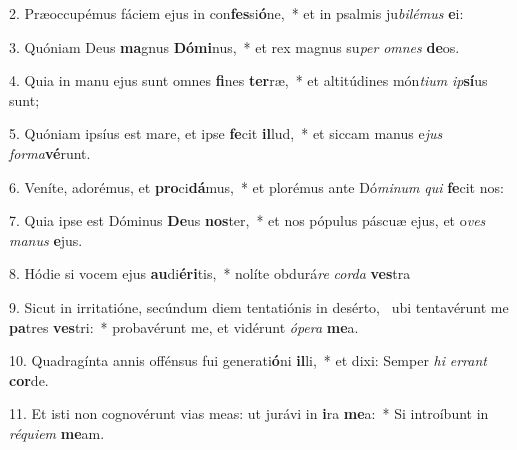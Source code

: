 2. Præoccupémus fáciem ejus in con\textbf{fes}si\textbf{ó}ne,~*  et in psalmis ju\textit{bi}\textit{lé}\textit{mus} \textbf{e}i:\

3. Quóniam Deus \textbf{ma}gnus \textbf{Dó}\textbf{mi}nus,~*  et rex magnus su\textit{per} \textit{om}\textit{nes} \textbf{de}os.\

4. Quia in manu ejus sunt omnes \textbf{fi}nes \textbf{ter}ræ,~*  et altitúdines món\textit{ti}\textit{um} \textit{ip}\textbf{sí}us sunt;\

5. Quóniam ipsíus est mare, et ipse \textbf{fe}cit \textbf{il}lud,~*  et siccam manus e\textit{jus} \textit{for}\textit{ma}\textbf{vé}runt.\

6. Veníte, adorémus, et \textbf{pro}ci\textbf{dá}mus,~*  et plorémus ante Dó\textit{mi}\textit{num} \textit{qui} \textbf{fe}cit nos:\

7. Quia ipse est Dóminus \textbf{De}us \textbf{nos}ter,~*  et nos pópulus páscuæ ejus, et o\textit{ves} \textit{ma}\textit{nus} \textbf{e}jus.\

8. Hódie si vocem ejus \textbf{au}di\textbf{é}\textbf{ri}tis,~*  nolíte obdurá\textit{re} \textit{cor}\textit{da} \textbf{ves}tra\

9. Sicut in irritatióne, secúndum diem tentatiónis in desérto, \dag\  ubi tentavérunt me \textbf{pa}tres \textbf{ves}tri:~*  probavérunt me, et vidérunt \textit{ó}\textit{pe}\textit{ra} \textbf{me}a.\

10. Quadragínta annis offénsus fui generati\textbf{ó}ni \textbf{il}li,~*  et dixi: Semper \textit{hi} \textit{er}\textit{rant} \textbf{cor}de.\

11. Et isti non cognovérunt vias meas: ut jurávi in \textbf{i}ra \textbf{me}a:~*  Si introíbunt in \textit{ré}\textit{qui}\textit{em} \textbf{me}am.\

